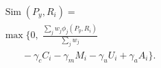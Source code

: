 \begin{equation}
\begin{aligned}
&\operatorname{Sim}(P_y,R_i)=\\[-1mm]
&\max\!\Biggl\{0,\;\frac{\sum_j w_j\phi_j(P_y,R_i)}{\sum_jw_j}\\[-1mm]
&\qquad-\gamma_cC_i-\gamma_mM_i-\gamma_uU_i+\gamma_aA_i\Biggr\}.
\end{aligned}
\tag{7}\label{eq:predicate_rule_similarity}
\end{equation}
